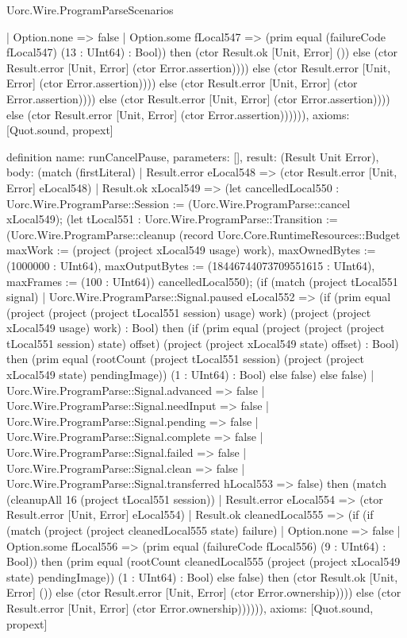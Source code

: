 \begin{lexlean}{Uorc.Wire.ProgramParseScenarios}
\begin{semanticmodule}
{      | Option.none => false
      | Option.some fLocal547 => (prim equal (failureCode fLocal547) (13 : UInt64) : Bool)) then (ctor Result.ok [Unit, Error] ()) else (ctor Result.error [Unit, Error] (ctor Error.assertion)))) else (ctor Result.error [Unit, Error] (ctor Error.assertion)))) else (ctor Result.error [Unit, Error] (ctor Error.assertion)))) else (ctor Result.error [Unit, Error] (ctor Error.assertion)))) else (ctor Result.error [Unit, Error] (ctor Error.assertion)))))),
  axioms: [Quot.sound, propext]
}

definition{
  name: runCancelPause,
  parameters: [],
  result: (Result Unit Error),
  body: (match (firstLiteral)
    | Result.error eLocal548 => (ctor Result.error [Unit, Error] eLocal548)
    | Result.ok xLocal549 => (let cancelledLocal550 : Uorc.Wire.ProgramParse::Session := (Uorc.Wire.ProgramParse::cancel xLocal549); (let tLocal551 : Uorc.Wire.ProgramParse::Transition := (Uorc.Wire.ProgramParse::cleanup (record Uorc.Core.RuntimeResources::Budget {maxWork := (project (project xLocal549 usage) work), maxOwnedBytes := (1000000 : UInt64), maxOutputBytes := (18446744073709551615 : UInt64), maxFrames := (100 : UInt64)}) cancelledLocal550); (if (match (project tLocal551 signal)
      | Uorc.Wire.ProgramParse::Signal.paused eLocal552 => (if (prim equal (project (project (project tLocal551 session) usage) work) (project (project xLocal549 usage) work) : Bool) then (if (prim equal (project (project (project tLocal551 session) state) offset) (project (project xLocal549 state) offset) : Bool) then (prim equal (rootCount (project tLocal551 session) (project (project xLocal549 state) pendingImage)) (1 : UInt64) : Bool) else false) else false)
      | Uorc.Wire.ProgramParse::Signal.advanced => false
      | Uorc.Wire.ProgramParse::Signal.needInput => false
      | Uorc.Wire.ProgramParse::Signal.pending => false
      | Uorc.Wire.ProgramParse::Signal.complete => false
      | Uorc.Wire.ProgramParse::Signal.failed => false
      | Uorc.Wire.ProgramParse::Signal.clean => false
      | Uorc.Wire.ProgramParse::Signal.transferred hLocal553 => false) then (match (cleanupAll 16 (project tLocal551 session))
      | Result.error eLocal554 => (ctor Result.error [Unit, Error] eLocal554)
      | Result.ok cleanedLocal555 => (if (if (match (project (project cleanedLocal555 state) failure)
        | Option.none => false
        | Option.some fLocal556 => (prim equal (failureCode fLocal556) (9 : UInt64) : Bool)) then (prim equal (rootCount cleanedLocal555 (project (project xLocal549 state) pendingImage)) (1 : UInt64) : Bool) else false) then (ctor Result.ok [Unit, Error] ()) else (ctor Result.error [Unit, Error] (ctor Error.ownership)))) else (ctor Result.error [Unit, Error] (ctor Error.ownership)))))),
  axioms: [Quot.sound, propext]
}


\end{semanticmodule}
\end{lexlean}
